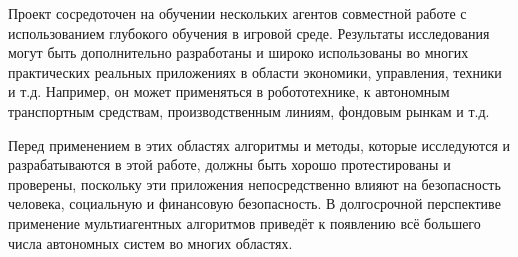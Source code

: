 Проект сосредоточен на обучении нескольких агентов совместной работе с использованием глубокого обучения в игровой среде. Результаты исследования могут быть дополнительно разработаны и широко использованы во многих практических реальных приложениях в области экономики, управления, техники и т.д. Например, он может применяться в робототехнике, к автономным транспортным средствам, производственным линиям, фондовым рынкам и т.д.

Перед применением в этих областях алгоритмы и методы, которые исследуются и разрабатываются в этой работе, должны быть хорошо протестированы и проверены, поскольку эти приложения непосредственно влияют на безопасность человека, социальную и финансовую безопасность. В долгосрочной перспективе применение мультиагентных алгоритмов приведёт к появлению всё большего числа автономных систем во многих областях.


